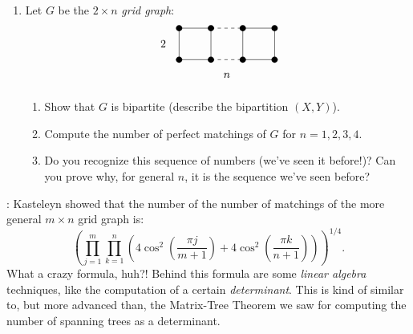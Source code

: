 \documentclass[11pt]{article}
\begin{document}
\begin{enumerate}
\item Let $G$ be the $2\times n$ \emph{grid graph}:
\[ \begin{tikzpicture}
\node at (-0.5,0.5) {$2$};
\node[fill=black, circle, inner sep=2pt] at (0,0) {};
\node[fill=black, circle, inner sep=2pt] at (0,1) {};
\node[fill=black, circle, inner sep=2pt] at (1,0) {};
\node[fill=black, circle, inner sep=2pt] at (1,1) {};
\node[fill=black, circle, inner sep=2pt] at (2,0) {};
\node[fill=black, circle, inner sep=2pt] at (2,1) {};
\node[fill=black, circle, inner sep=2pt] at (3,0) {};
\node[fill=black, circle, inner sep=2pt] at (3,1) {};
\draw (0,0) -- (0,1) -- (1,1) -- (1,0) -- (0,0);
\draw[dashed] (1,0) -- (2,0);
\draw[dashed] (1,1) -- (2,1);
\draw (2,0) -- (2,1) -- (3,1) -- (3,0) -- (2,0);
\node at (1.5,-0.5) {$n$};
\end{tikzpicture} \]
\begin{enumerate}
\item Show that $G$ is bipartite (describe the bipartition $(X,Y)$).
\item Compute the number of perfect matchings of $G$ for $n=1,2,3,4$.
\item Do you recognize this sequence of numbers (we've seen it before!)? Can you prove why, for general $n$, it is the sequence we've seen before?
\end{enumerate}
\end{enumerate}

: Kasteleyn showed that the number of the number of matchings of the more general $m \times n$ grid graph is:
\[ \left(\prod_{j=1}^{m} \prod_{k=1}^{n} \left( 4 \cos^2\left( \frac{\pi j}{m+1} \right) + 4\cos^2 \left( \frac{\pi k}{n+1} \right)\right) \right)^{1/4}.\]
What a crazy formula, huh?! Behind this formula are some \emph{linear algebra} techniques, like the computation of a certain \emph{determinant}. This is kind of similar to, but more advanced than, the Matrix-Tree Theorem we saw for computing the number of spanning trees as a determinant.
\end{document}
